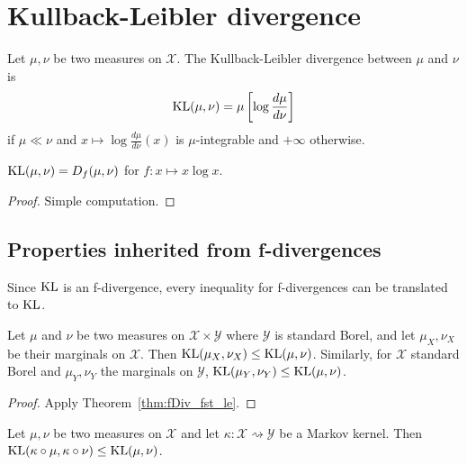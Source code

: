 \chapter{Kullback-Leibler divergence}

\begin{definition}
  \label{def:KL}
  \leanok
  Let $\mu, \nu$ be two measures on $\mathcal X$. The Kullback-Leibler divergence between $\mu$ and $\nu$ is
  \begin{align*}
  \mathrm{KL}(\mu, \nu) = \mu\left[\log \frac{d \mu}{d \nu}\right]
  \end{align*}
  if $\mu \ll \nu$ and $x \mapsto \log \frac{d \mu}{d \nu}(x)$ is $\mu$-integrable and $+\infty$ otherwise.
\end{definition}

\begin{lemma}
  \label{lem:kl_eq_fDiv}
  \leanok
  $\mathrm{KL}(\mu, \nu) = D_f(\mu, \nu)$ for $f: x \mapsto x \log x$.
\end{lemma}

\begin{proof}
Simple computation.
\end{proof}

\section{Properties inherited from f-divergences}

Since $\mathrm{KL}$ is an f-divergence, every inequality for f-divergences can be translated to $\mathrm{KL}$.

\begin{theorem}[Marginals]
  \label{thm:kl_fst_le}
  Let $\mu$ and $\nu$ be two measures on $\mathcal X \times \mathcal Y$ where $\mathcal Y$ is standard Borel, and let $\mu_X, \nu_X$ be their marginals on $\mathcal X$.
  Then $\mathrm{KL}(\mu_X, \nu_X) \le \mathrm{KL}(\mu, \nu)$.
  Similarly, for $\mathcal X$ standard Borel and $\mu_Y, \nu_Y$ the marginals on $\mathcal Y$, $\mathrm{KL}(\mu_Y, \nu_Y) \le \mathrm{KL}(\mu, \nu)$.
\end{theorem}

\begin{proof}
Apply Theorem~\ref{thm:fDiv_fst_le}.
\end{proof}

\begin{theorem}
  \label{thm:kl_data_proc}
  Let $\mu, \nu$ be two measures on $\mathcal X$ and let $\kappa : \mathcal X \rightsquigarrow \mathcal Y$ be a Markov kernel.
  Then $\mathrm{KL}(\kappa \circ \mu, \kappa \circ \nu) \le \mathrm{KL}(\mu, \nu)$.
\end{theorem}


